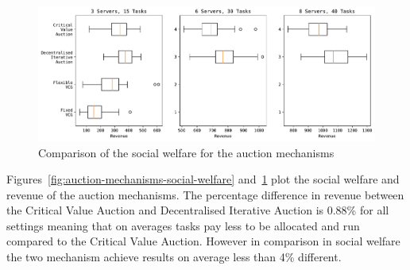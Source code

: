 \begin{figure}[h]
    \centering
    \includegraphics[width=\linewidth]{figs/auctions/multi_setting_revenue.pdf}
    \caption{Comparison of the social welfare for the auction mechanisms}
    \label{fig:auction-mechanisms-revenue}
\end{figure}

Figures~\ref{fig:auction-mechanisms-social-welfare} and~\ref{fig:auction-mechanisms-revenue} plot the social welfare
and revenue of the auction mechanisms. The percentage difference in revenue between the Critical Value Auction and
Decentralised Iterative Auction is 0.88\% for all settings meaning that on averages tasks pay less to be allocated and
run compared to the Critical Value Auction. However in comparison in social welfare the two mechanism achieve results
on average less than 4\% different.


